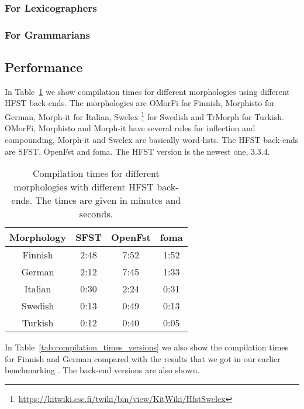 \documentclass{llncs}
\begin{document}
\subsubsection{For Lexicographers}

\subsubsection{For Grammarians}

\subsection{Performance}

In Table~\ref{tab:compilation_times} we show compilation times for different 
morphologies using different HFST back-ends. The morphologies are OMorFi 
\cite{pirinen/2008} for Finnish, Morphisto \cite{zielinski/2009} for German,
Morph-it \cite{Zanchetta_2005-1} for Italian, Swelex 
\footnote{\url{https://kitwiki.csc.fi/twiki/bin/view/KitWiki/HfstSwelex}} 
for Swedish and TrMorph \cite{Coltekin/2010} for Turkish. 
OMorFi, Morphisto and Morph-it have several rules for
inflection and compounding, Morph-it and Swelex are basically word-lists.
The HFST back-ends are SFST, OpenFst and foma. The HFST version is the newest one, 3.3.4.

\begin{table} [h!]
\centering
  \begin{tabular}{| c | c | c | c |}
    \hline
    Morphology & SFST & OpenFst & foma \\ \hline\hline
    Finnish & 2:48 & 7:52 & 1:52 \\ \hline
    German & 2:12 & 7:45 & 1:33 \\ \hline
    Italian & 0:30 & 2:24 & 0:31 \\ \hline
    Swedish & 0:13 & 0:49 & 0:13 \\ \hline
    Turkish & 0:12 & 0:40 & 0:05 \\ \hline
    \end{tabular}
  \caption{Compilation times for different morphologies with
    different HFST back-ends. The times are given in minutes and seconds.}
  \label{tab:compilation_times}
\end{table}


In Table~\ref{tab:compilation_times_versions} we also show the compilation 
times for Finnish and German compared with the results that we got in our 
earlier benchmarking \cite{hfst/2011}. The back-end versions are also shown.
\end{document}
